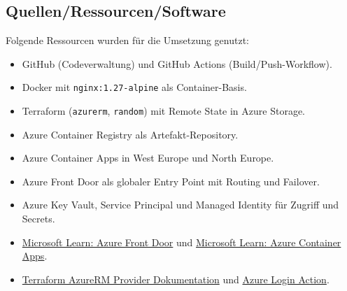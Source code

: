 \documentclass[a4paper,11pt]{article}
\begin{document}
\subsection*{Quellen/Ressourcen/Software}
Folgende Ressourcen wurden für die Umsetzung genutzt:
\begin{itemize}
  \item GitHub (Codeverwaltung) und GitHub Actions (Build/Push-Workflow).
  \item Docker mit \texttt{nginx:1.27-alpine} als Container-Basis.
  \item Terraform (\texttt{azurerm}, \texttt{random}) mit Remote State in Azure Storage.
  \item Azure Container Registry als Artefakt-Repository.
  \item Azure Container Apps in West Europe und North Europe.
  \item Azure Front Door als globaler Entry Point mit Routing und Failover.
  \item Azure Key Vault, Service Principal und Managed Identity für Zugriff und Secrets.
  \item \href{https://learn.microsoft.com/azure/frontdoor/front-door-overview}{Microsoft Learn: Azure Front Door} und \href{https://learn.microsoft.com/azure/container-apps/overview}{Microsoft Learn: Azure Container Apps}.
  \item \href{https://registry.terraform.io/providers/hashicorp/azurerm/latest/docs}{Terraform AzureRM Provider Dokumentation} und \href{https://github.com/azure/login}{Azure Login Action}.
\end{itemize}
\end{document}
